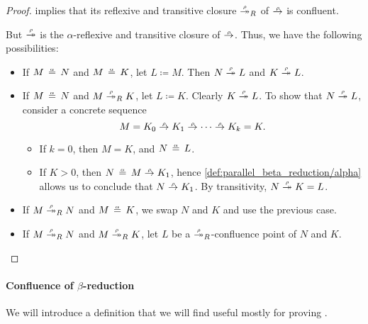 \begin{proof}
   implies that its reflexive and transitive closure \( {\rred*_R} \) of \( {\rred} \) is confluent.

  But \( {\rred*} \) is the \( \alpha \)-reflexive and transitive closure of \( {\rred} \). Thus, we have the following possibilities:
  \begin{itemize}
    \item If \( M \aequiv N \) and \( M \aequiv K \), let \( L \coloneqq M \). Then \( N \rred* L \) and \( K \rred* L \).

    \item If \( M \aequiv N \) and \( M \rred*_R K \), let \( L \coloneqq K \). Clearly \( K \rred* L \). To show that \( N \rred* L \), consider a concrete sequence
    \begin{equation*}
      M = K_0 \rred K_1 \rred \cdots \rred K_k = K.
    \end{equation*}

    \begin{itemize}
      \item If \( k = 0 \), then \( M = K \), and \( N \aequiv L \).
      \item If \( K > 0 \), then \( N \aequiv M \rred K_1 \), hence \ref{def:parallel_beta_reduction/alpha} allows us to conclude that \( N \rred K_1 \). By transitivity, \( N \rred* K = L \).
    \end{itemize}

    \item If \( M \rred*_R N \) and \( M \aequiv K \), we swap \( N \) and \( K \) and use the previous case.

    \item If \( M \rred*_R N \) and \( M \rred*_R K \), let \( L \) be a \( {\rred*_R} \)-confluence point of \( N \) and \( K \).
  \end{itemize}
\end{proof}

\paragraph{Confluence of \( \beta \)-reduction}\hfill

We will introduce a definition that we will find useful mostly for proving .

